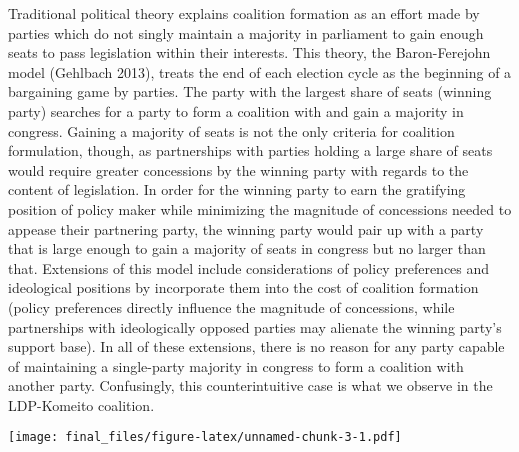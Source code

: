 \documentclass[
]{article}
\begin{document}
Traditional political theory explains coalition formation as an effort
made by parties which do not singly maintain a majority in parliament to
gain enough seats to pass legislation within their interests. This
theory, the Baron-Ferejohn model (Gehlbach 2013), treats the end of each
election cycle as the beginning of a bargaining game by parties. The
party with the largest share of seats (winning party) searches for a
party to form a coalition with and gain a majority in congress. Gaining
a majority of seats is not the only criteria for coalition formulation,
though, as partnerships with parties holding a large share of seats
would require greater concessions by the winning party with regards to
the content of legislation. In order for the winning party to earn the
gratifying position of policy maker while minimizing the magnitude of
concessions needed to appease their partnering party, the winning party
would pair up with a party that is large enough to gain a majority of
seats in congress but no larger than that. Extensions of this model
include considerations of policy preferences and ideological positions
by incorporate them into the cost of coalition formation (policy
preferences directly influence the magnitude of concessions, while
partnerships with ideologically opposed parties may alienate the winning
party's support base). In all of these extensions, there is no reason
for any party capable of maintaining a single-party majority in congress
to form a coalition with another party. Confusingly, this
counterintuitive case is what we observe in the LDP-Komeito coalition.

\texttt{[image: final\_files/figure-latex/unnamed-chunk-3-1.pdf]}
\end{document}
